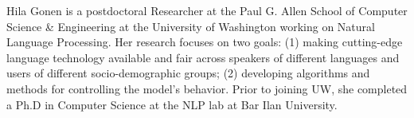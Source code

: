 Hila Gonen is a postdoctoral Researcher at the Paul G. Allen School of Computer Science \& Engineering at the University of Washington working on Natural Language Processing.
Her research focuses on two goals: (1) making cutting-edge language technology available and fair across speakers of different languages and users of different socio-demographic groups; (2) developing algorithms and methods for controlling the model’s behavior. Prior to joining UW, she completed a Ph.D in Computer Science at the NLP lab at Bar Ilan University.
